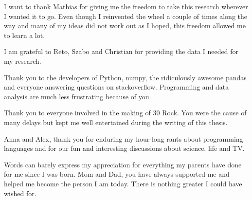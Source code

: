 I want to thank Mathias for giving me the freedom to take this research
wherever I wanted it to go. Even though I reinvented the wheel a couple of
times along the way and many of my ideas did not work out as I hoped, this
freedom allowed me to learn a lot.

I am grateful to Reto, Szabo and Christian for providing the data I needed for
my research.

Thank you to the developers of Python, numpy, the ridiculously awesome pandas
and everyone answering questions on stackoverflow. Programming and data
analysis are much less frustrating because of you.

Thank you to everyone involved in the making of 30 Rock. You were the cause of
many delays but kept me well entertained during the writing of this thesis.

Anna and Alex, thank you for enduring my hour-long rants about programming
languages and for our fun and interesting discussions about science, life and
TV.

Words can barely express my appreciation for everything my parents have done
for me since I was born. Mom and Dad, you have always supported me and helped
me become the person I am today. There is nothing greater I could have wished
for.


